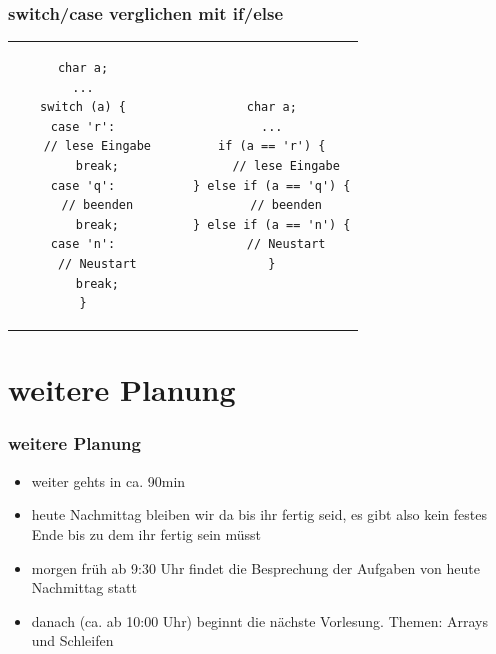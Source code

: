 \documentclass[final]{beamer}
\begin{document}
\begin{frame}[containsverbatim]
\frametitle{switch/case verglichen mit if/else}
	\begin{tabular}{c c c c}
	\begin{lstlisting}
char a;
...
switch (a) {
case 'r':
	// lese Eingabe
	break;
case 'q':
	// beenden
	break;
case 'n':
	// Neustart
	break;
}
	\end{lstlisting}

& & &

	\begin{lstlisting}
char a;
...
if (a == 'r') {
	// lese Eingabe
} else if (a == 'q') {
	// beenden
} else if (a == 'n') {
	// Neustart
}
	\end{lstlisting}\\
	\end{tabular}
\end{frame}

\section{weitere Planung}
\begin{frame}
\frametitle{weitere Planung}
	\begin{itemize}
		\item{weiter gehts in ca. 90min}
		\item{heute Nachmittag bleiben wir da bis ihr fertig seid, es gibt also kein festes Ende bis zu dem ihr fertig sein müsst}
		\item{morgen früh ab 9:30 Uhr findet die Besprechung der Aufgaben von heute Nachmittag statt}
		\item{danach (ca. ab 10:00 Uhr) beginnt die nächste Vorlesung. Themen: Arrays und Schleifen}
	\end{itemize}
\end{frame}


\end{document}
